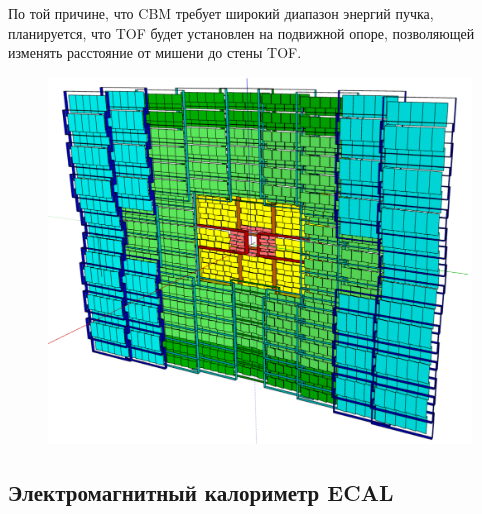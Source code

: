 По той причине, что CBM требует широкий диапазон энергий пучка, планируется, что TOF будет установлен на подвижной опоре, позволяющей изменять расстояние от мишени до стены TOF.


\begin{figure}[H]
\includegraphics[width=1.0\textwidth]{pictures/TOF.png}
\caption{}
\label{fig:TOF}
\end{figure}


\subsection{Электромагнитный калориметр ECAL}\label{sec:secECAL}

